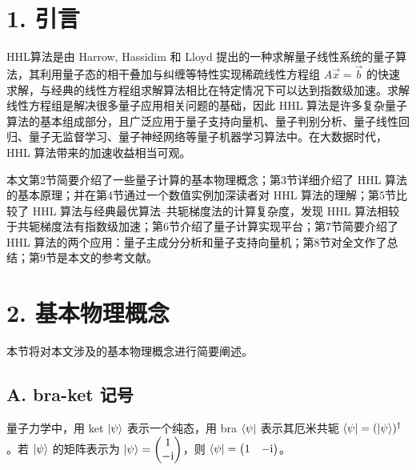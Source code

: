 \documentclass[aps,prl,twocolumn,groupedaddress]{revtex4-2}
\begin{document}
\section{1. 引言}

HHL算法是由 Harrow, Hassidim 和 Lloyd 提出的一种求解量子线性系统的量子算法，其利用量子态的相干叠加与纠缠等特性实现稀疏线性方程组 $A\vec{x}=\vec{b}$ 的快速求解，与经典的线性方程组求解算法相比在特定情况下可以达到指数级加速。求解线性方程组是解决很多量子应用相关问题的基础，因此 HHL 算法是许多复杂量子算法的基本组成部分，且广泛应用于量子支持向量机、量子判别分析、量子线性回归、量子无监督学习、量子神经网络等量子机器学习算法中。在大数据时代，HHL 算法带来的加速收益相当可观。

本文第2节简要介绍了一些量子计算的基本物理概念；第3节详细介绍了 HHL 算法的基本原理；并在第4节通过一个数值实例加深读者对 HHL 算法的理解；第5节比较了 HHL 算法与经典最优算法--共轭梯度法的计算复杂度，发现 HHL 算法相较于共轭梯度法有指数级加速；第6节介绍了量子计算实现平台；第7节简要介绍了 HHL 算法的两个应用：量子主成分分析和量子支持向量机；第8节对全文作了总结；第9节是本文的参考文献。


\section{2. 基本物理概念}

本节将对本文涉及的基本物理概念进行简要阐述。

\subsection{A. bra-ket 记号}

量子力学中，用 ket $\ket{\psi}$ 表示一个纯态，用 bra $\bra{\psi}$ 表示其厄米共轭 $\bra{\psi}=(\ket{\psi})^\dag$。若 $\ket{\psi}$ 的矩阵表示为 $\ket{\psi}=\begin{pmatrix} 1\\ -\mathrm{i} \end{pmatrix}$，则 $\bra{\psi}=\begin{pmatrix} 1 &-\mathrm{i} \end{pmatrix}$。
\end{document}
